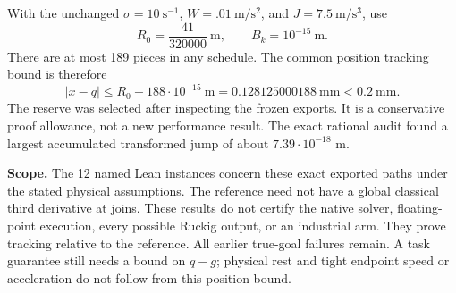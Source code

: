 With the unchanged $\sigma=10\ \mathrm{s}^{-1}$, $W=.01\ \mathrm{m/s^2}$, and $J=7.5\ \mathrm{m/s^3}$, use
\[
R_0=\frac{41}{320000}\ \mathrm{m},\qquad B_k=10^{-15}\ \mathrm{m}.
\]
There are at most 189 pieces in any schedule. The common position tracking bound is therefore
\[
|x-q|\leq R_0+188\cdot10^{-15}\ \mathrm{m}
=0.128125000188\ \mathrm{mm}<0.2\ \mathrm{mm}.
\]
The reserve was selected after inspecting the frozen exports. It is a conservative proof allowance, not a new performance result. The exact rational audit found a largest accumulated transformed jump of about $7.39\cdot10^{-18}$ m.

\textbf{Scope.} The 12 named Lean instances concern these exact exported paths under the stated physical assumptions. The reference need not have a global classical third derivative at joins. These results do not certify the native solver, floating-point execution, every possible Ruckig output, or an industrial arm. They prove tracking relative to the reference. All earlier true-goal failures remain. A task guarantee still needs a bound on $q-g$; physical rest and tight endpoint speed or acceleration do not follow from this position bound.
